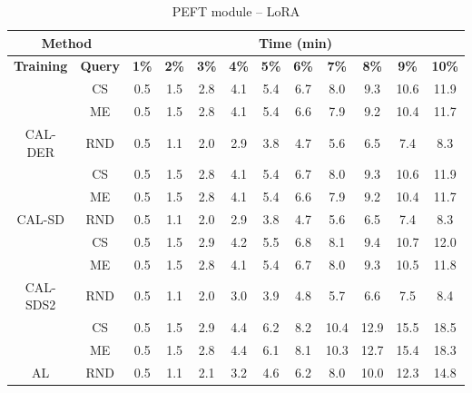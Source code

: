\begin{table}[htbp]
\centering
\begin{subtable}{\linewidth}
\centering
\caption{PEFT module -- Adapter}

\begin{tabular}{c|c|cccccccccc}
\toprule
\multicolumn{2}{c|}{\textbf{Method}} & \multicolumn{10}{c}{\textbf{Time (min)}} \\
\midrule
\textbf{Training} & \textbf{Query} & \textbf{1\%} & \textbf{2\%} & \textbf{3\%} & \textbf{4\%} & \textbf{5\%} & \textbf{6\%} & \textbf{7\%} & \textbf{8\%} & \textbf{9\%} & \textbf{10\%}\\
\midrule
 & CS & 0.5 & 1.5 & 2.8 & 4.1 & 5.4 & 6.7 & 8.0 & 9.3 & 10.6 & 11.9\\

 & ME & 0.5 & 1.5 & 2.8 & 4.1 & 5.4 & 6.6 & 7.9 & 9.2 & 10.4 & 11.7\\

\multirow{-3}{*}{\raggedright\arraybackslash CAL-DER} & RND & 0.5 & 1.1 & 2.0 & 2.9 & 3.8 & 4.7 & 5.6 & 6.5 & 7.4 & 8.3\\
\midrule
 & CS & 0.5 & 1.5 & 2.8 & 4.1 & 5.4 & 6.7 & 8.0 & 9.3 & 10.6 & 11.9\\

 & ME & 0.5 & 1.5 & 2.8 & 4.1 & 5.4 & 6.6 & 7.9 & 9.2 & 10.4 & 11.7\\

\multirow{-3}{*}{\raggedright\arraybackslash CAL-SD} & RND & 0.5 & 1.1 & 2.0 & 2.9 & 3.8 & 4.7 & 5.6 & 6.5 & 7.4 & 8.3\\
\midrule
 & CS & 0.5 & 1.5 & 2.9 & 4.2 & 5.5 & 6.8 & 8.1 & 9.4 & 10.7 & 12.0\\

 & ME & 0.5 & 1.5 & 2.8 & 4.1 & 5.4 & 6.7 & 8.0 & 9.3 & 10.5 & 11.8\\

\multirow{-3}{*}{\raggedright\arraybackslash CAL-SDS2} & RND & 0.5 & 1.1 & 2.0 & 3.0 & 3.9 & 4.8 & 5.7 & 6.6 & 7.5 & 8.4\\
\midrule
 & CS & 0.5 & 1.5 & 2.9 & 4.4 & 6.2 & 8.2 & 10.4 & 12.9 & 15.5 & 18.5\\

 & ME & 0.5 & 1.5 & 2.8 & 4.4 & 6.1 & 8.1 & 10.3 & 12.7 & 15.4 & 18.3\\

\multirow{-3}{*}{\raggedright\arraybackslash AL} & RND & 0.5 & 1.1 & 2.1 & 3.2 & 4.6 & 6.2 & 8.0 & 10.0 & 12.3 & 14.8\\
\bottomrule
\end{tabular}
\end{subtable}
\vspace{1em}
\begin{subtable}{\linewidth}
\centering
\caption{PEFT module -- LoRA}


\end{subtable}
\end{table}
